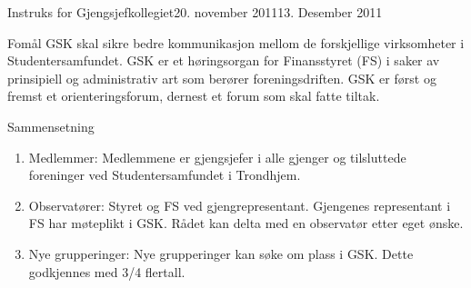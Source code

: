 \documentclass[../fsbok.tex]{subfiles}
\begin{document}
\begin{instruks}{Instruks for Gjengsjefkollegiet}{20. november 2011}{13. Desember 2011}

    \begin{instruksledd}{Fomål}
        GSK skal sikre bedre kommunikasjon mellom de forskjellige virksomheter i
        Studentersamfundet.
        GSK er et høringsorgan for Finansstyret (FS) i saker av prinsipiell og
        administrativ art som berører
        foreningsdriften. GSK er først og fremst et orienteringsforum, dernest et forum
        som skal fatte tiltak.
    \end{instruksledd}

    \begin{instruksledd}{Sammensetning}
        \begin{enumerate}
            \item Medlemmer:
                Medlemmene er gjengsjefer i alle gjenger og tilsluttede foreninger ved
                Studentersamfundet i Trondhjem.
            \item Observatører:
                Styret og FS ved gjengrepresentant. Gjengenes representant i FS har møteplikt i
                GSK. Rådet kan delta med
                en observatør etter eget ønske.
            \item Nye grupperinger:
                Nye grupperinger kan søke om plass i GSK. Dette godkjennes med 3/4 flertall.
        \end{enumerate}
    \end{instruksledd}


\end{instruks}
\end{document}

